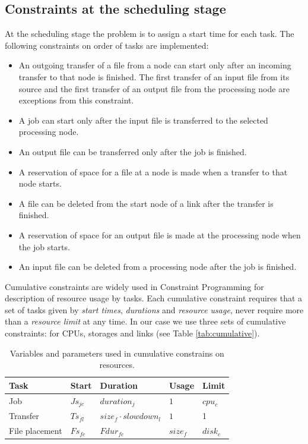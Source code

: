 \documentclass[english]{ddny}
\begin{document}
\subsection{Constraints at the scheduling stage}
At the scheduling stage the problem is to assign a start time for each task. The following constraints on order of tasks are implemented:
\begin{itemize}
\item An outgoing transfer of a file from a node can start only after an incoming transfer to that node is finished.  The first transfer of an input file from its source and the first transfer of an output file from the processing node are exceptions from this constraint.
\item A job can start only after the input file is transferred to the selected processing node.
\item An output file can be transferred only after the job is finished.
\item A reservation of space for a file at a node is made when a transfer to that node starts.
\item A file can be deleted from the start node of a link after the transfer is finished.
\item  A reservation of space for an output file is made at the processing node when the job starts.
\item An input file can be deleted from a processing node after the job is finished.
\end{itemize}
Cumulative constraints are widely used in Constraint Programming for description of resource usage by tasks. Each cumulative constraint requires that a set of tasks given by \textit{start times}, \textit{durations} and \textit{resource usage}, never require more than a \textit{resource limit} at any time. In our case we use three sets of cumulative constraints: for CPUs, storages and links (see Table \ref{tab:cumulative}).

\begin{table}
\caption{Variables and parameters used in cumulative constrains on resources.}
\label{tab:cumulative}
\begin{center}
\begin{tabular}{ l  l  l  l  l }
 \hline                   
  Task & Start & Duration & Usage & Limit \\ \hline 
  Job & \textbf{$Js_{jc}$} & $duration_{j}$ & $1$ & $cpu_{c}$ \\ 
  Transfer & \textbf{$Ts_{fl}$} & $size_{f}\cdot slowdown_{l}$ & $1$ & 1 \\ 
  File placement & \textbf{$Fs_{fc}$} & \textbf{$Fdur_{fc}$} & $size_{f}$ & $disk_{c}$ \\ 
  \hline 
\end{tabular}
    \label{fig:simulated grig} 
    \end{center}
\end{table}
\end{document}
